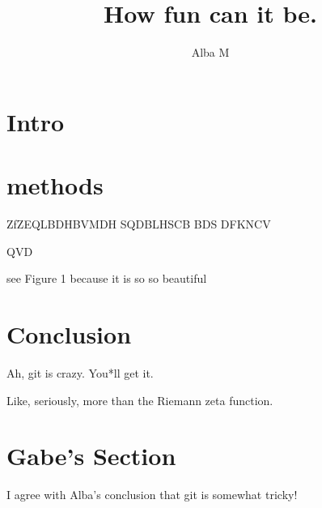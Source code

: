 \documentclass{article}
\author{Alba M}
\title{How fun can it be.}
\begin{document}
	\maketitle
	\section{Intro}
	\section{methods}
	ZfZEQLBDHBVMDH
	SQDBLHSCB
	BDS
	DFKNCV
	
	QVD
	
	see Figure 1 because it is so so beautiful
	
	\section{Conclusion}
	Ah, git is crazy. You*ll get it.
	
	Like, seriously, more than the Riemann zeta function.

	\section{Gabe's Section}
	I agree with Alba's conclusion that git is somewhat tricky!
\end{document}
